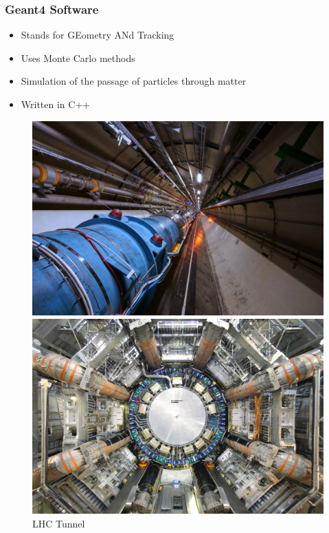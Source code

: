 \documentclass[aspectratio-169]{beamer}
\begin{document}
\begin{frame}
\frametitle{Geant4 Software}

\begin{itemize}
    \item Stands for GEometry ANd Tracking
    \item Uses Monte Carlo methods
    \item Simulation of the passage of particles through matter
    \item Written in C++
\end{itemize}

\begin{figure}
    \centering
    \begin{minipage}[b]{0.4\textwidth}
        \includegraphics[width=\textwidth]{lhc.jpg}
        \caption{LHC Tunnel}
    \end{minipage}
    \hfill
    \begin{minipage}[b]{0.4\textwidth}
        \includegraphics[width=\textwidth]{atlas.jpg}

\end{minipage}
\end{figure}
\end{frame}
\end{document}
